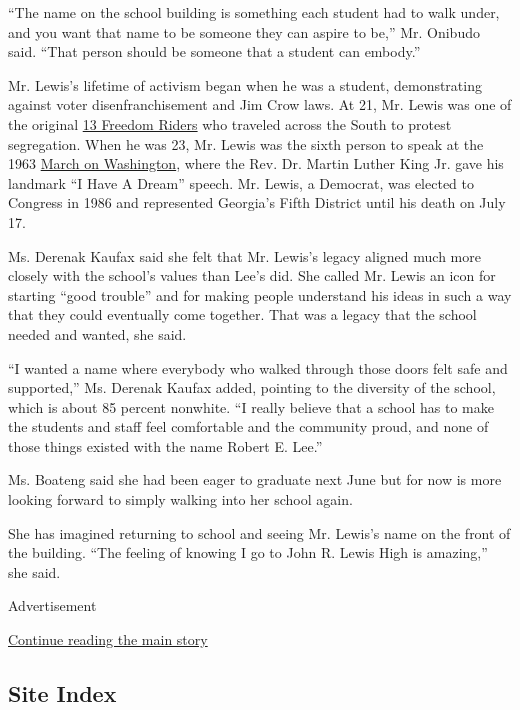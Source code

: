 ``The name on the school building is something each student had to walk
under, and you want that name to be someone they can aspire to be,'' Mr.
Onibudo said. ``That person should be someone that a student can
embody.''

Mr. Lewis's lifetime of activism began when he was a student,
demonstrating against voter disenfranchisement and Jim Crow laws. At 21,
Mr. Lewis was one of the original
\href{https://www.nytimes.com/2020/07/18/us/politics/freedom-riders-john-lewis-work.html}{13
Freedom Riders} who traveled across the South to protest segregation.
When he was 23, Mr. Lewis was the sixth person to speak at the 1963
\href{https://archive.nytimes.com/www.nytimes.com/interactive/2013/08/24/us/march-on-washington-original-coverage.html}{March
on Washington}, where the Rev. Dr. Martin Luther King Jr. gave his
landmark ``I Have A Dream'' speech. Mr. Lewis, a Democrat, was elected
to Congress in 1986 and represented Georgia's Fifth District until his
death on July 17.

Ms. Derenak Kaufax said she felt that Mr. Lewis's legacy aligned much
more closely with the school's values than Lee's did. She called Mr.
Lewis an icon for starting ``good trouble'' and for making people
understand his ideas in such a way that they could eventually come
together. That was a legacy that the school needed and wanted, she said.

``I wanted a name where everybody who walked through those doors felt
safe and supported,'' Ms. Derenak Kaufax added, pointing to the
diversity of the school, which is about 85 percent nonwhite. ``I really
believe that a school has to make the students and staff feel
comfortable and the community proud, and none of those things existed
with the name Robert E. Lee.''

Ms. Boateng said she had been eager to graduate next June but for now is
more looking forward to simply walking into her school again.

She has imagined returning to school and seeing Mr. Lewis's name on the
front of the building. ``The feeling of knowing I go to John R. Lewis
High is amazing,'' she said.

Advertisement

\protect\hyperlink{after-bottom}{Continue reading the main story}

\hypertarget{site-index}{%
\subsection{Site Index}\label{site-index}}

